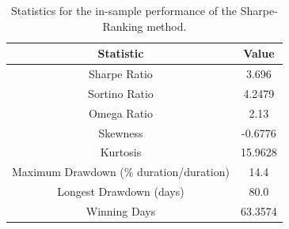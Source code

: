 \begin{table}
	\centering
	\begin{tabular}{c|c}
		\textbf{Statistic} & \textbf{Value} \\\hline
		Sharpe Ratio & 3.696 \\ 
		Sortino Ratio & 4.2479 \\ 
		Omega Ratio & 2.13 \\ 
		Skewness & -0.6776 \\ 
		Kurtosis & 15.9628 \\ 
		Maximum Drawdown (\% duration/duration) & 14.4 \\ 
		Longest Drawdown (days) & 80.0 \\ 
		Winning Days & 63.3574 \\ 
	\end{tabular}
	\caption{\label{tab:widgets} Statistics for the in-sample performance of the Sharpe-Ranking method.}
\end{table}

